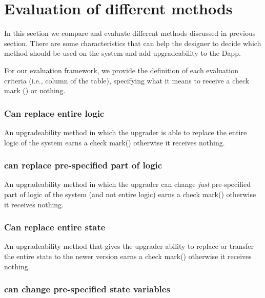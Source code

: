  \section{Evaluation of different methods}
 
 In this section we compare and evaluate different methods discussed in previous section. There are some characteristics that can help the designer to decide which method should be used on the system and add upgradeability to the Dapp.

 For our evaluation framework, we provide the definition of each evaluation criteria (i.e., column of the table), specifying what it means to receive a check mark (\checkmark) or nothing.

 
 
 
\subsubsection{Can replace entire logic}

An upgradeability method in which the upgrader is able to replace the entire logic of the system earns a check mark(\checkmark) otherwise it receives nothing.

\subsubsection{can replace pre-specified part of logic}

An upgradeability method in which the upgrader can change \emph{just} pre-specified part of logic of the system (and not entire logic) earns a check mark(\checkmark) otherwise it receives nothing.

\subsubsection{Can replace entire state}

An upgradeability method that gives the upgrader ability to replace or transfer the entire state to the newer version earns a check mark(\checkmark) otherwise it receives nothing.

\subsubsection{can change pre-specified state variables}
 
